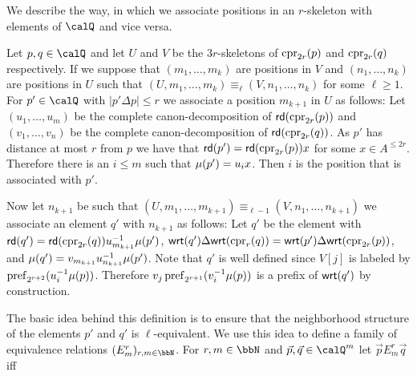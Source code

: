 We describe the way, in which we associate positions in an $r$-skeleton with elements of $\Qx$ and vice versa. 
\begin{definition}
	Let $p,q\in \Qx$ and let $U$ and $V$ be the $3r$-skeletons of $\operatorname{cpr}_{2r}(p)$ and $\operatorname{cpr}_{2r}(q)$ respectively. If we suppose that $(m_1,\ldots,m_k)$ are positions in $V$ and $(n_1,\ldots,n_k)$ are positions in $U$ such that $(U,m_1,\ldots,m_k) \equiv_{\ell} (V,n_1,\ldots,n_k)$ for some $\ell \geq 1$. For $p'\in \Qx$ with $|p'\Delta p| \leq r$ we associate a position $m_{k+1}$ in $U$ as follows:
	Let $(u_1,\ldots, u_m)$ be the complete canon-decomposition of $\mathsf{rd}(\operatorname{cpr}_{2r}(p))$ and $(v_1,\ldots,v_n)$ be the complete canon-decomposition of $\mathsf{rd}(\operatorname{cpr}_{2r}(q))$. As $p'$ has distance at most $r$ from $p$ we have that $\mathsf{rd}(p') = \mathsf{rd}(\operatorname{cpr}_{2r}(p))x$
	for some $x\in A^{\leq 2r}$. Therefore there is an $i\leq m$ such that $\mu(p') = u_ix$. Then $i$ is the position that is associated with $p'$.
	
	Now let $n_{k+1}$ be such that $(U,m_1,\ldots,m_{k+1}) \equiv_{\ell-1} (V,n_1,\ldots,n_{k+1})$ we associate an element $q'$ with $n_{k+1}$ as follows:
	Let $q'$ be the element with $\mathsf{rd}(q') = \mathsf{rd}(\operatorname{cpr}_{2r}(q))u_{m_{k+1}}^{-1}\mu(p')$, $\mathsf{wrt}(q')\Delta\mathsf{wrt}(\operatorname{cpr}_r({q})) = \mathsf{wrt}(p')\Delta\mathsf{wrt}(\operatorname{cpr}_{2r}({p}))$, and 
	$\mu(q') = v_{m_{k+1}}u_{n_{k+1}}^{-1}\mu(p')$. Note that $q'$ is well defined since $V[j]$ is labeled by $\operatorname{pref}_{2^{r+2}}(u_i^{-1}\mu(p))$. Therefore $v_j\operatorname{pref}_{2^{r+1}}(v_i^{-1}\mu(p))$ is a prefix of $\mathsf{wrt}(q')$ by construction.
\end{definition}
The basic idea behind this definition is to ensure that the neighborhood structure of the elements $p'$ and $q'$ is $\ell$-equivalent. We use this idea to  define a family of  equivalence relations $(E^r_m)_{r,m\in\bbN}$.
For $r,m\in \bbN$ and $\vec{p},\vec{q}\in \Qx^m$ let $\vec{p} E^r_m \vec{q}$ iff
